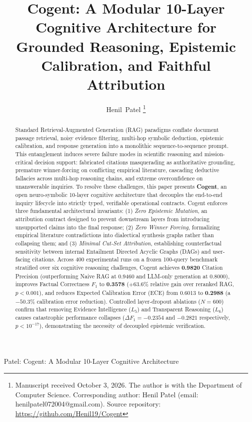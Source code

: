 \documentclass[journal,compsoc]{IEEEtran}
\begin{document}
\title{Cogent: A Modular 10-Layer Cognitive Architecture for Grounded Reasoning, Epistemic Calibration, and Faithful Attribution}

\author{Henil~Patel%
\thanks{Manuscript received October 3, 2026. The author is with the Department of Computer Science. Corresponding author: Henil Patel (email: henilpatel072004@gmail.com). Source repository: \url{https://github.com/Henil19/Cogent}}%
}

%
{Patel: Cogent: A Modular 10-Layer Cognitive Architecture}

\maketitle

\begin{abstract}
Standard Retrieval-Augmented Generation (RAG) paradigms conflate document passage retrieval, noisy evidence filtering, multi-hop symbolic deduction, epistemic calibration, and response generation into a monolithic sequence-to-sequence prompt. This entanglement induces severe failure modes in scientific reasoning and mission-critical decision support: fabricated citations masquerading as authoritative grounding, premature winner-forcing on conflicting empirical literature, cascading deductive fallacies across multi-hop reasoning chains, and extreme overconfidence on unanswerable inquiries. To resolve these challenges, this paper presents \textbf{Cogent}, an open neuro-symbolic 10-layer cognitive architecture that decouples the end-to-end inquiry lifecycle into strictly typed, verifiable operational contracts. Cogent enforces three fundamental architectural invariants: (1) \textit{Zero Epistemic Mutation}, an attribution contract designed to prevent downstream layers from introducing unsupported claims into the final response; (2) \textit{Zero Winner Forcing}, formalizing empirical literature contradictions into dialectical synthesis graphs rather than collapsing them; and (3) \textit{Minimal Cut-Set Attribution}, establishing counterfactual sensitivity between internal Entailment Directed Acyclic Graphs (DAGs) and user-facing citations. Across 400 experimental runs on a frozen 100-query benchmark stratified over six cognitive reasoning challenges, Cogent achieves \textbf{0.9820} Citation Precision (outperforming Naive RAG at 0.9460 and LLM-only generation at 0.8000), improves Factual Correctness $F_1$ to \textbf{0.3578} ($+63.6\%$ relative gain over reranked RAG, $p < 0.001$), and reduces Expected Calibration Error (ECE) from 0.6013 to \textbf{0.2988} (a $-50.3\%$ calibration error reduction). Controlled layer-dropout ablations ($N=600$) confirm that removing Evidence Intelligence ($L_5$) and Transparent Reasoning ($L_6$) causes catastrophic performance collapses ($\Delta F_1 = -0.2354$ and $-0.2821$ respectively, $p < 10^{-17}$), demonstrating the necessity of decoupled epistemic verification.
\end{abstract}
\end{document}
